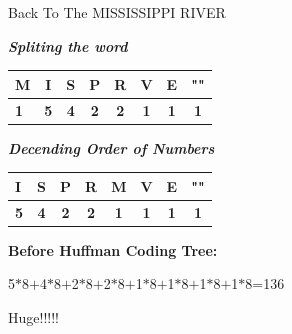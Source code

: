 \documentclass[12pt]{beamer}
\begin{document}
\begin{frame} {Back To The MISSISSIPPI RIVER}

	\textit{\textbf{Spliting the word }}

	\pause
     
     \begin{table}[bt]
	\begin{tabular}{|l|c|c|c|c|c|c|c|} \hline 
	\textbf{M} & \textbf{I} & \textbf{S} & \textbf{P} & \textbf{R} & \textbf{V} & \textbf{E} &\textbf{""} \\ \hline
	
	\textbf{1} & \textbf{5} & \textbf{4} & \textbf{2} & \textbf{2} & \textbf{1} & \textbf{1} &\textbf{1} \\ \hline
	\end{tabular}
\end{table}	
	
     
	\pause
	
	\textit{\textbf{Decending Order of Numbers}}
	 
     \begin{table}[bt]
	\begin{tabular}{|l|c|c|c|c|c|c|c|} \hline 
	\textbf{I} & \textbf{S} & \textbf{P} & \textbf{R} & \textbf{M} & \textbf{V} & \textbf{E} &\textbf{""} \\ \hline
	
	\textbf{5} & \textbf{4} & \textbf{2} & \textbf{2} & \textbf{1} & \textbf{1} & \textbf{1} &\textbf{1} \\ \hline
	\end{tabular}
\end{table}	
     
\end{frame}

\begin{frame}
      {\color{red}\textbf{Before Huffman Coding Tree:}}
	  \pause
	  
	 5$*$8$+$4$*$8$+$2$*$8$+$2$*$8$+$1$*$8$+$1$*$8$+$1$*$8$+$1$*$8=136 \\	 
	 
	 
	\pause	 
	

	 \begin{block} {\color{red}\Huge{Huge!!!!!}} 
\end{block}	 	 
	 
	        
\end{frame}
\end{document}
